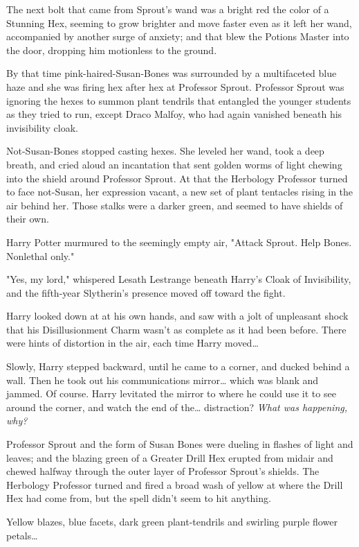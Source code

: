 The next bolt that came from Sprout's wand was a bright red the color of a 
Stunning Hex, seeming to grow brighter and move faster even as it left her 
wand, accompanied by another surge of anxiety; and that blew the Potions Master 
into the door, dropping him motionless to the ground.

By that time pink-haired-Susan-Bones was surrounded by a multifaceted blue haze 
and she was firing hex after hex at Professor Sprout. Professor Sprout was 
ignoring the hexes to summon plant tendrils that entangled the younger students 
as they tried to run, except Draco Malfoy, who had again vanished beneath his 
invisibility cloak.

Not-Susan-Bones stopped casting hexes. She leveled her wand, took a deep 
breath, and cried aloud an incantation that sent golden worms of light chewing 
into the shield around Professor Sprout. At that the Herbology Professor turned 
to face not-Susan, her expression vacant, a new set of plant tentacles rising 
in the air behind her. Those stalks were a darker green, and seemed to have 
shields of their own.

Harry Potter murmured to the seemingly empty air, "Attack Sprout. Help Bones. 
Nonlethal only."

"Yes, my lord," whispered Lesath Lestrange beneath Harry's Cloak of 
Invisibility, and the fifth-year Slytherin's presence moved off toward the 
fight.

Harry looked down at at his own hands, and saw with a jolt of unpleasant shock 
that his Disillusionment Charm wasn't as complete as it had been before. There 
were hints of distortion in the air, each time Harry moved{\ldots}

Slowly, Harry stepped backward, until he came to a corner, and ducked behind a 
wall. Then he took out his communications mirror{\ldots} which was blank and 
jammed. Of course. Harry levitated the mirror to where he could use it to see 
around the corner, and watch the end of the{\ldots} distraction? \emph{What was 
happening, why?}

Professor Sprout and the form of Susan Bones were dueling in flashes of light 
and leaves; and the blazing green of a Greater Drill Hex erupted from midair 
and chewed halfway through the outer layer of Professor Sprout's shields. The 
Herbology Professor turned and fired a broad wash of yellow at where the Drill 
Hex had come from, but the spell didn't seem to hit anything.

Yellow blazes, blue facets, dark green plant-tendrils and swirling purple 
flower petals{\ldots}

